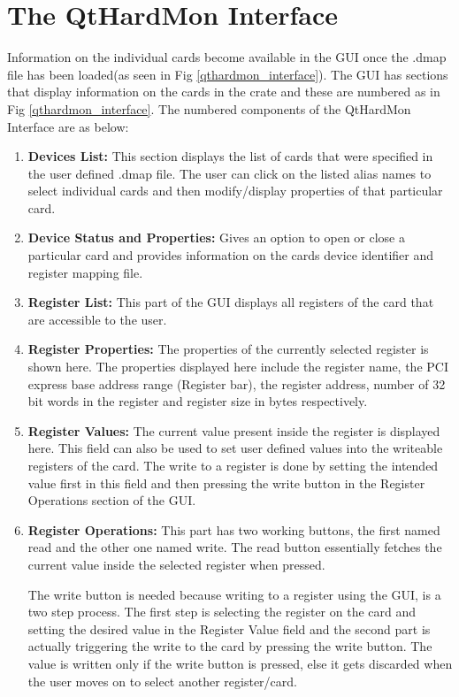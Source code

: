 \section{The QtHardMon Interface}
Information on the individual cards become available in the GUI once the .dmap file has been loaded(as seen in Fig \ref{qthardmon_interface}). The GUI has sections that display information on the cards in the crate and these are numbered as in Fig \ref{qthardmon_interface}. The numbered components of the QtHardMon Interface are as below:
\begin{enumerate}
\item \textbf{Devices List:} This section displays the list of cards that were specified in the user defined .dmap file. The user can click on the listed alias names to select individual cards and then modify/display properties of that particular card. 
\item \textbf{Device Status and Properties:} Gives an option to open or close a particular card and provides information on the cards device identifier and register mapping file.

\item \textbf{Register List:} This part of the GUI displays all registers of the card that are accessible to the user.

\item \textbf{Register Properties:} The properties of the currently selected register is shown here. The properties displayed here include the register name, the PCI express base address range (Register bar), the register address, number of 32 bit words in the register and register size in bytes respectively.

\item \textbf{Register Values:} The current value present inside the register is displayed here. This field can also be used to set user defined values into the writeable registers of the card. The write to a register is done by setting the intended value first in this field and then pressing the write button in the Register Operations section  of the GUI.

\item \textbf{Register Operations:} \label{itm:Register_Operations} This part has two working buttons, the first named read and the other one named write. The read button essentially fetches the current value inside the selected register when pressed.

The write button is needed because writing to a register using the GUI, is a two step process. The first step is selecting the register on the card and setting the desired value in the Register Value field and the second part is actually triggering the write to the card by pressing the write button. The value is written only if the write button is pressed, else it gets discarded when the user moves on to select another register/card. 


\end{enumerate}
